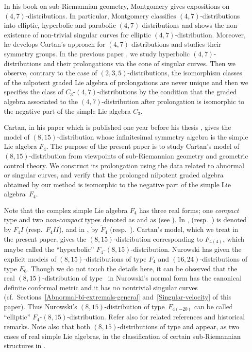 \documentclass[pdftex]{sigma}
\numberwithin{equation}{section}
\theoremstyle{definition}
\newcommand{\0}{\boldsymbol{0}}
\begin{document}
In his book \cite{Montgomery} on sub-Riemannian geometry,
Montgomery gives expositions on $(4, 7)$-distributions.
In particular, Montgomery classifies $(4, 7)$-distributions into elliptic, hyperbolic and parabolic $(4, 7)$-distributions and
shows the non-existence of non-trivial singular curves for elliptic $(4, 7)$-distribution. Moreover, he develops
Cartan's approach for $(4, 7)$-distributions and studies their symmetry groups.
In the previous paper \cite{IM}, we study hyperbolic $(4, 7)$-distributions and their prolongations via
the cone of singular curves.
Then we observe, contrary to the case of $(2, 3, 5)$-distributions,
the isomorphism classes of the nilpotent graded Lie algebra of prolongations are never unique and
then we specifies the class of $C_3$-$(4, 7)$-distributions by the condition that
 the graded algebra associated to the $(4, 7)$-distribution
 after prolongation is isomorphic to the negative part of the simple Lie algebra $C_3$.

Cartan, in his paper \cite{Cartan1} which is published one year before his thesis \cite{Cartan2},
gives the model of $(8, 15)$-distribution
whose infinitesimal symmetry algebra is the simple Lie algebra $F_4$.
The purpose of the present paper is to study Cartan's model of $(8, 15)$-distribution from viewpoints of
sub-Riemannian geometry and geometric control theory.
We construct its prolongation using the data related to abnormal or singular curves,
and verify that the prolonged nilpotent graded algebra obtained
by our method is isomorphic to the negative part of the simple Lie algebra~$F_4$.

Note that the complex simple Lie algebra $F_4$ has three real forms;
one {\it compact} type and two {\it non-compact} types
denoted as  and as  (see \cite{Cartan1, Cartan2, Cartan3, Gantmacher, Jacobson}).
In \cite{Helgason},  (resp.~) is denoted by $F_4I$ (resp.\ $F_4II$),
and in \cite{Harvey}, by $\widetilde{F}_4$ (resp.\ ).
Cartan's model, which we treat in the present paper, gives the
$(8, 15)$-distribution corresponding to $F_{4(4)}$, which maybe called
the ``hyperbolic'' $F_4$-$(8, 15)$-distribution.
Nurowski \cite{Nurowski}
has given the explicit models of $(8, 15)$-distributions of type $F_4$ and $(16, 24)$-distributions of type
$E_6$. Though we do not touch the details here,
it can be observed that the real $(8, 15)$-distribution of type~ in Nurowski's normal form has
the canonical definite conformal metric and it has no nontrivial singular curves
 (cf.\ Sections~\ref{Abnormal-bi-extremals-general} and~\ref{Singular-velocity} of this paper).
Thus Nurowski's $(8, 15)$-distribution of type~$F_{4(-20)}$ can be called
 ``elliptic'' $F_4$-$(8, 15)$-distribution. Refer \cite{Nurowski} also for related references and historical remarks.
 Note also that both $(8, 15)$-distributions of type
  and  appear, as two cases of real simple Lie algebras,
 in the classification of certain sub-Riemannian structures in \cite{AS2, MKMV}.
\end{document}
